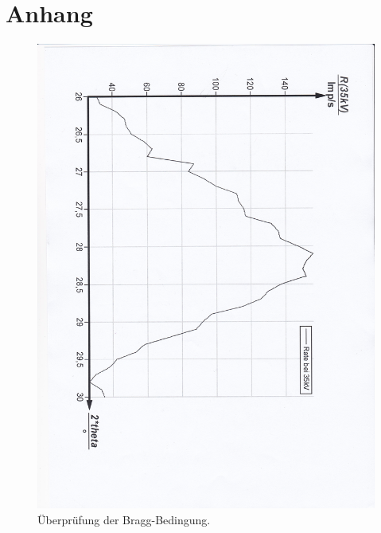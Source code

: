 \section{Anhang}
\begin{figure}[p]
  \centering
  \includegraphics[width=\textwidth]{content/Ueberpruefung.jpg}
  \caption{Überprüfung der Bragg-Bedingung.}
  \label{Bild:1}
\end{figure}
